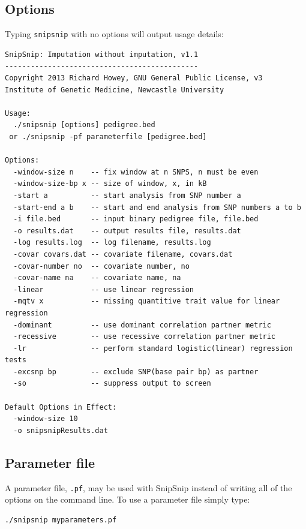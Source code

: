 \documentclass[a4paper,12pt]{article}
\newcommand{\code}[1]{{\footnotesize{{\tt #1}}}}
\begin{document}
\subsection{Options}
\label{options}

Typing \code{snipsnip} with no options will output usage details: 
\begin{verbatim}
SnipSnip: Imputation without imputation, v1.1
---------------------------------------------
Copyright 2013 Richard Howey, GNU General Public License, v3
Institute of Genetic Medicine, Newcastle University

Usage:
  ./snipsnip [options] pedigree.bed 
 or ./snipsnip -pf parameterfile [pedigree.bed]

Options:
  -window-size n    -- fix window at n SNPS, n must be even
  -window-size-bp x -- size of window, x, in kB
  -start a          -- start analysis from SNP number a
  -start-end a b    -- start and end analysis from SNP numbers a to b
  -i file.bed       -- input binary pedigree file, file.bed
  -o results.dat    -- output results file, results.dat
  -log results.log  -- log filename, results.log
  -covar covars.dat -- covariate filename, covars.dat
  -covar-number no  -- covariate number, no
  -covar-name na    -- covariate name, na
  -linear           -- use linear regression
  -mqtv x           -- missing quantitive trait value for linear regression
  -dominant         -- use dominant correlation partner metric
  -recessive        -- use recessive correlation partner metric
  -lr               -- perform standard logistic(linear) regression tests
  -excsnp bp        -- exclude SNP(base pair bp) as partner
  -so               -- suppress output to screen

Default Options in Effect:
  -window-size 10
  -o snipsnipResults.dat

\end{verbatim}


\subsection{Parameter file}
\label{parameterfile}

A parameter file, \code{.pf}, may be used with SnipSnip instead of writing all of the options on the command line. To use a parameter file simply type: 
\begin{verbatim}
./snipsnip myparameters.pf
\end{verbatim}
\end{document}
